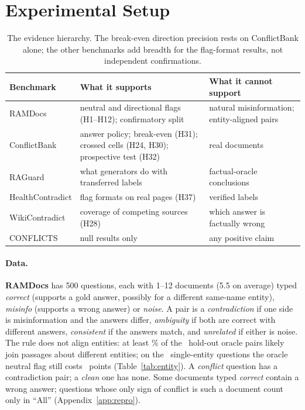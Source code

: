 \section{Experimental Setup}
\label{sec:setup}

\begin{table}[t]
\centering\scriptsize
\setlength{\tabcolsep}{3pt}
\begin{tabular}{@{}>{\raggedright\arraybackslash}p{1.45cm}>{\raggedright\arraybackslash}p{2.85cm}>{\raggedright\arraybackslash}p{2.75cm}@{}}
\toprule
Benchmark & What it supports & What it cannot support \\
\midrule
RAMDocs & neutral and directional flags (H1--H12); confirmatory split & natural misinformation; entity-aligned pairs \\
ConflictBank & answer policy; break-even (H31); crossed cells (H24, H30); prospective test (H32) & real documents \\
RAGuard & what generators do with transferred labels & factual-oracle conclusions \\
Health\-Contradict & flag formats on real pages (H37) & verified labels \\
WikiContradict & coverage of competing sources (H28) & which answer is factually wrong \\
CONFLICTS & null results only & any positive claim \\
\bottomrule
\end{tabular}
\caption{The evidence hierarchy. The break-even direction precision rests on ConflictBank alone; the other benchmarks add
breadth for the flag-format results, not independent confirmations.}
\label{tab:evidence}
\end{table}

\paragraph{Data.}
\textbf{RAMDocs} \citep{wang2025madam} has 500 questions, each with 1--12 documents (5.5 on average) typed
\emph{correct} (supports a gold answer, possibly for a different same-name entity), \emph{misinfo} (supports a wrong
answer) or \emph{noise}. A pair is a \emph{contradiction} if one side is misinformation and the answers differ,
\emph{ambiguity} if both are correct with different answers, \emph{consistent} if the answers match, and
\emph{unrelated} if either is noise. The rule does not align entities: at least \pairCrossLbShare\% of the \pairContraN\ hold-out
oracle pairs likely join passages about different entities; on the \pairSingleN\ single-entity questions the oracle
neutral flag still costs \aentNeuSingle\ points (Table~\ref{tab:entity}).
A \emph{conflict} question has a contradiction pair; a \emph{clean} one has none. Some documents typed \emph{correct} contain a wrong answer; questions whose only sign of
conflict is such a document count only in ``All'' (Appendix~\ref{app:repro}).

